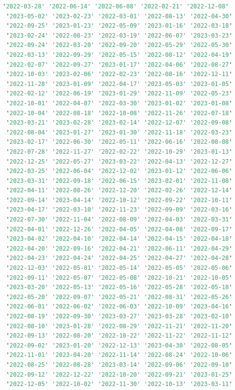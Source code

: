 \begin{lstlisting}[language=haskell, caption=Valores por columna, captionpos=b, label=lst:fiboHaskell]
 '2022-03-28' '2022-06-14' '2022-06-08' '2022-02-21' '2022-12-08'
 '2023-05-02' '2023-02-23' '2022-03-01' '2022-08-13' '2022-04-30'
 '2022-09-25' '2023-01-23' '2022-05-09' '2023-01-16' '2022-03-18'
 '2023-02-24' '2022-08-23' '2022-03-19' '2022-06-07' '2023-03-23'
 '2022-09-24' '2022-03-20' '2022-09-20' '2022-05-29' '2022-05-30'
 '2022-03-13' '2022-09-29' '2022-05-15' '2022-08-12' '2022-04-19'
 '2022-02-07' '2022-09-27' '2023-01-17' '2022-04-06' '2022-08-27'
 '2022-10-03' '2023-02-06' '2022-02-23' '2022-08-16' '2022-12-11'
 '2022-11-28' '2023-01-09' '2022-04-17' '2023-05-03' '2023-01-05'
 '2022-02-12' '2022-06-19' '2023-01-29' '2022-11-09' '2022-05-23'
 '2022-10-01' '2022-04-07' '2022-03-30' '2023-01-02' '2023-01-08'
 '2022-10-04' '2022-08-18' '2022-10-08' '2022-11-26' '2022-07-18'
 '2023-03-21' '2023-02-28' '2023-02-14' '2022-12-07' '2022-09-08'
 '2022-08-04' '2023-01-27' '2023-01-30' '2022-11-18' '2022-03-23'
 '2023-02-17' '2022-06-30' '2022-05-11' '2022-06-16' '2022-08-08'
 '2022-07-28' '2022-11-27' '2022-02-22' '2022-10-29' '2023-01-13'
 '2022-12-25' '2022-05-27' '2023-03-22' '2022-04-13' '2022-12-27'
 '2022-03-25' '2022-06-04' '2022-12-02' '2023-01-12' '2022-06-06'
 '2023-03-31' '2022-09-18' '2022-06-15' '2023-02-01' '2022-11-08'
 '2022-04-11' '2022-08-26' '2022-12-20' '2022-02-26' '2022-12-14'
 '2022-09-14' '2023-04-14' '2022-10-12' '2022-09-22' '2022-10-11'
 '2023-04-17' '2022-03-10' '2022-11-23' '2022-09-09' '2022-03-16'
 '2022-07-30' '2022-11-04' '2022-08-09' '2022-04-03' '2022-03-31'
 '2022-04-01' '2022-12-26' '2022-04-05' '2022-04-08' '2022-09-17'
 '2023-04-02' '2022-04-10' '2022-04-14' '2022-04-15' '2022-04-18'
 '2022-04-20' '2022-09-16' '2022-04-21' '2022-06-11' '2022-04-29'
 '2022-04-23' '2022-04-24' '2022-04-25' '2022-04-27' '2022-04-28'
 '2022-12-03' '2022-05-01' '2022-05-14' '2022-05-05' '2022-05-06'
 '2022-09-11' '2022-05-07' '2022-05-08' '2022-10-21' '2022-10-05'
 '2023-03-20' '2022-05-13' '2022-05-16' '2022-05-28' '2022-05-18'
 '2022-05-20' '2022-09-07' '2022-05-21' '2022-08-31' '2022-05-26'
 '2022-06-01' '2022-06-02' '2022-06-03' '2022-10-09' '2023-04-16'
 '2022-08-19' '2022-09-30' '2023-03-27' '2023-03-28' '2023-02-10'
 '2022-08-10' '2023-01-28' '2022-08-29' '2022-11-21' '2022-11-20'
 '2022-09-13' '2022-08-20' '2022-10-22' '2022-11-22' '2022-11-12'
 '2022-09-02' '2023-01-20' '2022-12-13' '2023-04-30' '2022-08-05'
 '2022-11-01' '2023-04-20' '2022-11-14' '2022-08-24' '2022-10-06'
 '2022-08-25' '2022-08-28' '2023-03-14' '2022-09-06' '2022-09-10'
 '2022-09-12' '2022-12-22' '2022-10-20' '2022-09-21' '2023-01-25'
 '2022-12-05' '2022-10-02' '2022-11-30' '2022-10-13' '2023-03-11'

\end{lstlisting}
